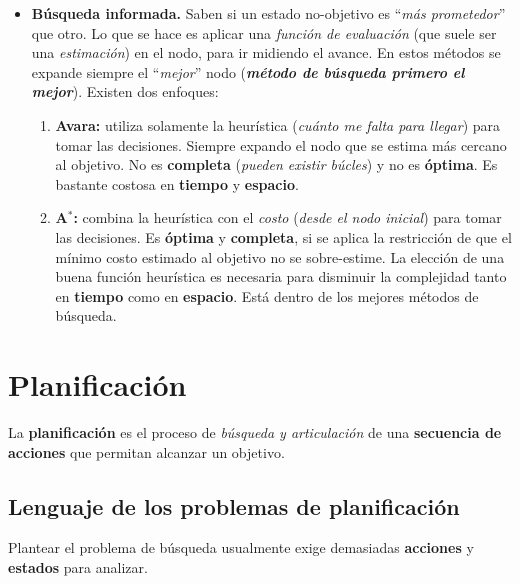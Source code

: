 \documentclass[10pt,a4paper]{article}
\begin{document}
\begin{itemize}
\begin{enumerate}
\end{enumerate}
\item \textbf{Búsqueda informada.} Saben si un estado no-objetivo es ``\textit{más prometedor}'' que otro. Lo que se hace es aplicar una \textit{función de evaluación} (que suele ser una \textit{estimación}) en el nodo, para ir midiendo el avance. En estos métodos se expande siempre el ``\textit{mejor}'' nodo (\textbf{\textit{método de búsqueda primero el mejor}}). Existen dos enfoques:
\begin{enumerate}
\item \textbf{Avara:} utiliza solamente la heurística (\textit{cuánto me falta para llegar}) para tomar las decisiones. Siempre expando el nodo que se estima más cercano al objetivo. No es \textbf{completa} (\textit{pueden existir búcles}) y no es \textbf{óptima}. Es bastante costosa en \textbf{tiempo} y \textbf{espacio}.
\item \textbf{A$^*$:} combina la heurística con el \textit{costo} (\textit{desde el nodo inicial}) para tomar las decisiones. Es \textbf{óptima} y \textbf{completa}, si se aplica la restricción de que el mínimo costo estimado al objetivo no se sobre-estime. La elección de una buena función heurística es necesaria para disminuir la complejidad tanto en \textbf{tiempo} como en \textbf{espacio}. Está dentro de los mejores métodos de búsqueda.
\end{enumerate}
\end{itemize}

\section{Planificación}

La \textbf{planificación} es el proceso de \textit{búsqueda y articulación} de una \textbf{secuencia de acciones} que permitan alcanzar un objetivo.

\subsection{Lenguaje de los problemas de planificación}

Plantear el problema de búsqueda usualmente exige demasiadas \textbf{acciones} y \textbf{estados} para analizar.
\end{document}
